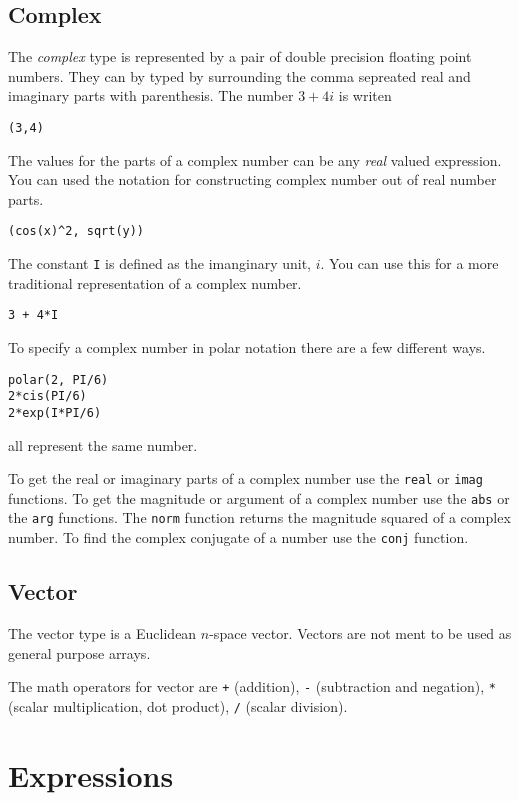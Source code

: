 \documentclass{article}
\begin{document}
\subsection{Complex}

The \emph{complex} type is represented by a pair of double precision floating point numbers. They can by typed by surrounding the comma sepreated real and imaginary parts with parenthesis. The number $3 + 4i$ is writen
\begin{verbatim}
(3,4)
\end{verbatim}
The values for the parts of a complex number can be any \emph{real} valued
expression.
You can used the notation for constructing complex number out of
real number parts.
\begin{verbatim}
(cos(x)^2, sqrt(y))
\end{verbatim}
The constant \verb|I| is defined as the imanginary unit, $i$. You can use this for a more traditional
representation of a complex number.
\begin{verbatim}
3 + 4*I
\end{verbatim}

To specify a complex number in polar notation there are a few different
ways.
\begin{verbatim}
polar(2, PI/6)
2*cis(PI/6)
2*exp(I*PI/6)
\end{verbatim}
all represent the same number.

To get the real or imaginary parts of a complex number use
the \verb|real| or \verb|imag| functions.
To get the magnitude or argument of a complex number use the
\verb|abs| or the \verb|arg| functions.
The \verb|norm| function returns the magnitude squared of a
complex number. To find the complex conjugate of a number
use the \verb|conj| function.

\subsection{Vector}

The vector type is a Euclidean $n$-space vector.
Vectors are not ment to be used as general purpose arrays.

The math operators for vector are \verb|+| (addition),
\verb|-| (subtraction and negation), \verb|*| (scalar multiplication,
dot product), \verb|/| (scalar division). 


\section{Expressions}
\end{document}
